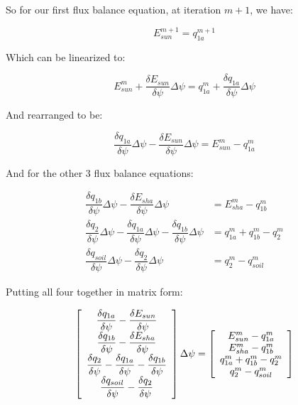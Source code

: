 \documentclass[draft,linenumbers]{agujournal}
\begin{document}
So for our first flux balance equation, at iteration $m+1$, we have:

   \begin{linenomath*} \begin{equation} 
   E_{sun}^{m+1}=q_{1a}^{m+1}
   \end{equation} \end{linenomath*}

Which can be linearized to:

   \begin{linenomath*} \begin{equation} 
   E_{sun}^{m}+\dfrac{\delta E_{sun}}{\delta\psi}\Delta\psi=q_{1a}^{m}+\dfrac{\delta q_{1a}}{\delta\psi}\Delta\psi
   \end{equation} \end{linenomath*}

And rearranged to be:

   \begin{linenomath*} \begin{equation} 
   \dfrac{\delta q_{1a}}{\delta\psi}\Delta\psi-\dfrac{\delta E_{sun}}{\delta\psi}\Delta\psi=E_{sun}^{m}-q_{1a}^{m}
   \end{equation} \end{linenomath*}

And for the other 3 flux balance equations:

   \begin{linenomath*} \begin{equation} 
   \begin{aligned}
   \dfrac{\delta q_{1b}}{\delta\psi}\Delta\psi-\dfrac{\delta E_{sha}}{\delta\psi}\Delta\psi&=E_{sha}^{m}-q_{1b}^{m} \\
   \dfrac{\delta q_2}{\delta\psi}\Delta\psi-\dfrac{\delta q_{1a}}{\delta\psi}\Delta\psi-\dfrac{\delta q_{1b}}{\delta\psi}\Delta\psi&=q_{1a}^{m}+q_{1b}^{m}-q_2^{m} \\
   \dfrac{\delta q_{soil}}{\delta\psi}\Delta\psi-\dfrac{\delta q_2}{\delta\psi}\Delta\psi&=q_2^{m}-q_{soil}^{m}
   \end{aligned}
   \end{equation} \end{linenomath*}

Putting all four together in matrix form:

   \begin{linenomath*} \begin{equation} 
   \left[ \begin {array}{c}
   \dfrac{\delta q_{1a}}{\delta\psi}-\dfrac{\delta E_{sun}}{\delta\psi} \cr
   \dfrac{\delta q_{1b}}{\delta\psi}-\dfrac{\delta E_{sha}}{\delta\psi} \cr
   \dfrac{\delta q_2}{\delta\psi}-\dfrac{\delta q_{1a}}{\delta\psi}-\dfrac{\delta q_{1b}}{\delta\psi} \cr
   \dfrac{\delta q_{soil}}{\delta\psi}-\dfrac{\delta q_2}{\delta\psi}
   \end {array} \right]
   \Delta\psi=
   \left[ \begin {array}{c}
   E_{sun}^{m}-q_{1a}^{m} \cr
   E_{sha}^{m}-q_{1b}^{m} \cr
   q_{1a}^{m}+q_{1b}^{m}-q_2^{m} \cr
   q_2^{m}-q_{soil}^{m}
   \end {array} \right]
   \end{equation} \end{linenomath*}
\end{document}
